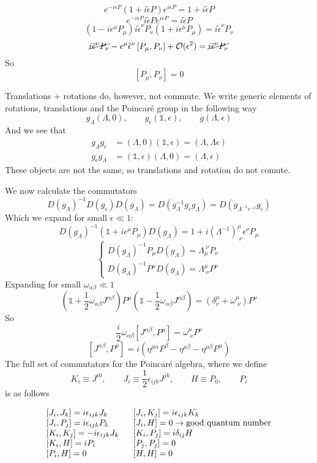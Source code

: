 \[ e^{-i\epsilon P}\left(1+i\tilde{\epsilon}P\right)e^{i\epsilon P} = 1+ i\tilde{\epsilon}P \]
\[ e^{-i\epsilon P}i\tilde{\epsilon}Pe^{i\epsilon P} = i\tilde{\epsilon}P \]
\[ \left(1-i\epsilon^\mu P_\mu\right)i\tilde{\epsilon}^\nu P_\nu \left(1+i\epsilon^\mu P_\mu\right) = i\tilde{\epsilon}^\nu P_\nu \]
\[ \cancel{i\tilde{\epsilon}^\nu P_\nu} - \epsilon^\mu\tilde{\epsilon}^\nu \left[P_\mu, P_\nu\right] + \mathcal{O}(\epsilon^2) = \cancel{i\tilde{\epsilon}^\nu P_\nu} \]
So
\[ \left[P_\mu, P_\nu\right] = 0\]

Translations + rotations do, however, not commute. We write generic elements of rotations, translations and the Poincaré group in the following way
\[ g_\Lambda(\Lambda,0), \qquad g_\epsilon(\mathbb{1},\epsilon), \qquad g(\Lambda,\epsilon) \]
And we see that
\begin{align*}
g_\Lambda g_\epsilon &= (\Lambda,0)(\mathbb{1},\epsilon) = (\Lambda, \Lambda \epsilon) \\
g_\epsilon g_\Lambda &= (\mathbb{1},\epsilon)(\Lambda,0) = (\Lambda,\epsilon)
\end{align*}
These objects are not the same, so translations and rotation do not comute.

We now calculate the commutators
\[ D(g_\Lambda)^{-1}D(g_\epsilon)D(g_\Lambda) = D(g_\Lambda^{-1}g_\epsilon g_\Lambda) = D(g_{\Lambda^{-1}\epsilon^{-1}}g_{\tilde{\epsilon}}) \]
Which we expand for small $\epsilon \ll 1$:
\[ D(g_\Lambda)^{-1}\left(\mathbb{1}+i\epsilon^\mu P_\mu\right)D(g_\Lambda) = 1+i(\Lambda^{-1})^\mu_{\;\nu}\epsilon^\nu P_\mu \]
\[ \begin{cases}
D(g_\Lambda)^{-1}P_\mu D(g_\Lambda) = \Lambda_\mu^{\;\nu}P_\nu \\
\boxed{D(g_\Lambda)^{-1}P^\mu D(g_\Lambda) = \Lambda^{\mu}_{\;\nu}P^\nu}
\end{cases} \]
Expanding for small $\omega_{\alpha\beta} \ll 1$
\[ (\mathbb{1}+\frac{1}{2}\omega_{\alpha\beta}J^{\alpha\beta})P^\mu(\mathbb{1}- \frac{1}{2}\omega_{\alpha\beta}J^{\alpha\beta}) = (\delta^\mu_\nu + \omega^\mu_{\;\nu})P^\nu \]
So
\[ \frac{i}{2}\omega_{\alpha\beta}\left[J^{\alpha\beta},P^\mu\right] = \omega^\mu_{\;\nu}P^\nu \]
\[ \boxed{\left[J^{\alpha\beta},P^\mu\right] = i \left(\eta^{\mu\alpha}P^\beta-\eta^{\mu\beta}-\eta^{\mu\beta}P^\alpha\right)} \]
The full set of commutators for the Poincaré algebra, where we define
\[ K_i \equiv J^{i0}, \qquad J_i \equiv \frac{1}{2}\epsilon_{ijk}J^{jk}, \qquad H \equiv P_0, \qquad P_i \]
is as follows

\[\begin{array}{l l}
\left[J_i,J_k\right] = i\epsilon_{ijk}J_k  \qquad& \left[J_i,K_j\right] = i\epsilon_{ijk}K_k \\
\left[J_i,P_j\right] = i\epsilon_{ijk}P_k & \left[J_i,H\right] = 0 \to \text{good quantum number} \\
\left[K_i,K_j\right] = -i\epsilon_{ijk}J_k & \left[K_i,P_j\right] = i\delta_{ij}H \\
\left[K_i,H\right] = iP_i & \left[P_j,P_j\right] = 0 \\
\left[P_i, H\right] = 0 & \left[H,H\right] = 0
\end{array}\]

